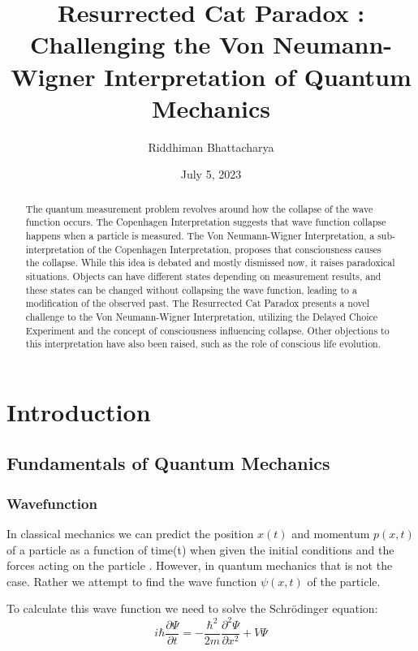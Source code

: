 \documentclass{article}
\title{\huge \textbf{Resurrected Cat Paradox : Challenging the Von Neumann-Wigner Interpretation of Quantum Mechanics}}
\author{Riddhiman Bhattacharya}
\date{July 5, 2023}
\begin{document}
\maketitle
\Large 
\begin{abstract}
\Large

The quantum measurement problem revolves around how the collapse of the wave function occurs. The Copenhagen Interpretation suggests that wave function collapse happens when a particle is measured. The Von Neumann-Wigner Interpretation, a sub-interpretation of the Copenhagen Interpretation, proposes that consciousness causes the collapse. While this idea is debated and mostly dismissed now, it raises paradoxical situations. Objects can have different states depending on measurement results, and these states can be changed without collapsing the wave function, leading to a modification of the observed past. The Resurrected Cat Paradox presents a novel challenge to the Von Neumann-Wigner Interpretation, utilizing the Delayed Choice Experiment and the concept of consciousness influencing collapse. Other objections to this interpretation have also been raised, such as the role of conscious life evolution.

\end{abstract}

\section{\Large Introduction}
\subsection{\Large Fundamentals of Quantum Mechanics}

\subsubsection{\Large Wavefunction}
In classical mechanics we can predict the position $x(t)$ and momentum $p(x,t)$ of a particle as a function of time(t) when given the initial conditions and the forces acting on the particle \cite{Griffiths2004Introduction}. However, in quantum mechanics that is not the case. Rather we attempt to find the wave function  $\psi(x,t)$ of the particle.

To calculate this wave function we need to solve the Schr\"{o}dinger equation:
\begin{equation}
i\hbar \frac{\partial \Psi}{\partial t} = -\frac{\hbar^2}{2m}
\frac{\partial^2 \Psi}{\partial x^2} + V \Psi
\label{eq:1}
\end{equation}
\end{document}
